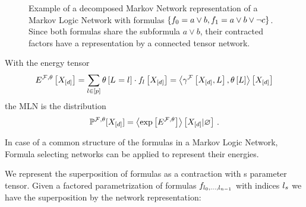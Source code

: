 \begin{figure}[h]
\begin{center}
	
\end{center}
\caption{Example of a decomposed Markov Network representation of a Markov Logic Network with formulas $\{f_{0} = a\lor b, f_{1} = a \lor b \lor \lnot c\}$.
	Since both formulas share the subformula $a\lor b$, their contracted factors have a representation by a connected tensor network.}
\label{fig:mlnDecRep}
\end{figure}





With the energy tensor
\begin{align}
	E^{\mathcal{F},\theta}\left[X_{[d]}\right]
	= \sum_{l\in[p]} \theta\left[L_{}=l_{}\right] \cdot f_{l}\left[X_{[d]}\right] 
	= \left\langle \gamma^{\mathcal{F}}\left[X_{[d]},L\right],\theta\left[L\right]\right\rangle \left[ X_{[d]} \right] 
\end{align}
the MLN is the distribution
\begin{align}
	\mathbb{P}^{\mathcal{F},\theta}[X_{[d]}] = \left\langle \mathrm{exp}\left[E^{\mathcal{F},\theta}\right]\right\rangle \left[ X_{[d]} | \varnothing \right] \, . 
\end{align}

In case of a common structure of the formulas in a Markov Logic Network, Formula selecting networks can be applied to represent their energies.

We represent the superposition of formulas as a contraction with s parameter tensor.
Given a factored parametrization of formulas $f_{l_{0},\ldots,l_{n-1}}$ with indices $l_{s}$ we have the superposition by the network representation:
\begin{center}
	
\end{center}


